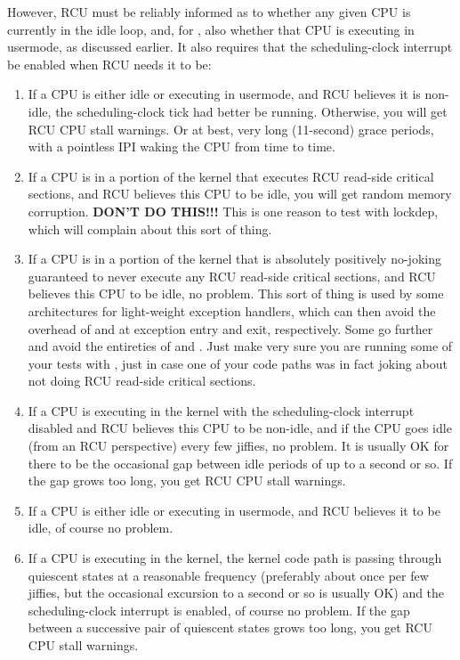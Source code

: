 However, RCU must be reliably informed as to whether any given CPU is
currently in the idle loop, and, for , also whether that
CPU is executing in usermode, as discussed earlier. %
It also requires that the
scheduling-clock interrupt be enabled when RCU needs it to be:

\begin{enumerate}
\item If a CPU is either idle or executing in usermode, and RCU believes it
   is non-idle, the scheduling-clock tick had better be running.
   Otherwise, you will get RCU CPU stall warnings.
   Or at best, very long
   (11-second) grace periods, with a pointless IPI waking the CPU from
   time to time.
\item If a CPU is in a portion of the kernel that executes RCU read-side
   critical sections, and RCU believes this CPU to be idle, you will get
   random memory corruption.
   \textbf{DON'T DO THIS!!!}
   This is one reason to test with lockdep, which will complain about
   this sort of thing.
\item If a CPU is in a portion of the kernel that is absolutely positively
   no-joking guaranteed to never execute any RCU read-side critical
   sections, and RCU believes this CPU to be idle, no problem.
   This
   sort of thing is used by some architectures for light-weight
   exception handlers, which can then avoid the overhead of
    and  at exception entry and
   exit, respectively.
   Some go further and avoid the entireties of
    and .
   Just make very sure you are running some of your tests with
   , just in case one of your code paths was in
   fact joking about not doing RCU read-side critical sections.
\item If a CPU is executing in the kernel with the scheduling-clock
   interrupt disabled and RCU believes this CPU to be non-idle, and if
   the CPU goes idle (from an RCU perspective) every few jiffies, no
   problem.
   It is usually OK for there to be the occasional gap between
   idle periods of up to a second or so.
   If the gap grows too long, you get RCU CPU stall warnings.
\item If a CPU is either idle or executing in usermode, and RCU believes it
   to be idle, of course no problem.
\item If a CPU is executing in the kernel, the kernel code path is passing
   through quiescent states at a reasonable frequency (preferably about
   once per few jiffies, but the occasional excursion to a second or so
   is usually OK) and the scheduling-clock interrupt is enabled, of
   course no problem.
   If the gap between a successive pair of quiescent states grows too
   long, you get RCU CPU stall warnings.
\end{enumerate}

